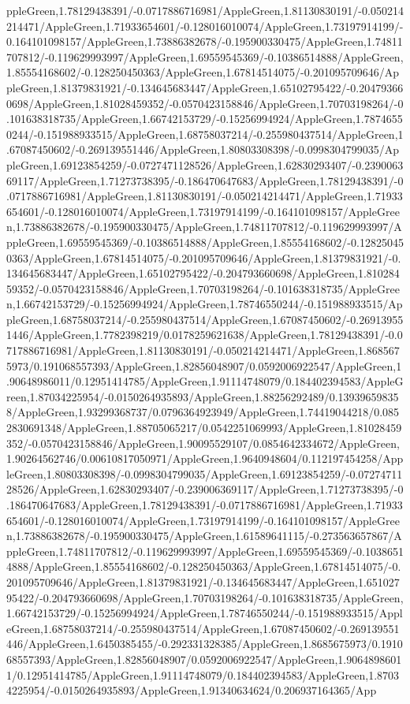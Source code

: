 {\begin{tikzternal}
{ppleGreen,1.78129438391/-0.0717886716981/AppleGreen,1.81130830191/-0.050214214471/AppleGreen,1.71933654601/-0.128016010074/AppleGreen,1.73197914199/-0.164101098157/AppleGreen,1.73886382678/-0.195900330475/AppleGreen,1.74811707812/-0.119629993997/AppleGreen,1.69559545369/-0.10386514888/AppleGreen,1.85554168602/-0.128250450363/AppleGreen,1.67814514075/-0.201095709646/AppleGreen,1.81379831921/-0.134645683447/AppleGreen,1.65102795422/-0.204793660698/AppleGreen,1.81028459352/-0.0570423158846/AppleGreen,1.70703198264/-0.101638318735/AppleGreen,1.66742153729/-0.15256994924/AppleGreen,1.78746550244/-0.151988933515/AppleGreen,1.68758037214/-0.255980437514/AppleGreen,1.67087450602/-0.269139551446/AppleGreen,1.80803308398/-0.0998304799035/AppleGreen,1.69123854259/-0.0727471128526/AppleGreen,1.62830293407/-0.239006369117/AppleGreen,1.71273738395/-0.186470647683/AppleGreen,1.78129438391/-0.0717886716981/AppleGreen,1.81130830191/-0.050214214471/AppleGreen,1.71933654601/-0.128016010074/AppleGreen,1.73197914199/-0.164101098157/AppleGreen,1.73886382678/-0.195900330475/AppleGreen,1.74811707812/-0.119629993997/AppleGreen,1.69559545369/-0.10386514888/AppleGreen,1.85554168602/-0.128250450363/AppleGreen,1.67814514075/-0.201095709646/AppleGreen,1.81379831921/-0.134645683447/AppleGreen,1.65102795422/-0.204793660698/AppleGreen,1.81028459352/-0.0570423158846/AppleGreen,1.70703198264/-0.101638318735/AppleGreen,1.66742153729/-0.15256994924/AppleGreen,1.78746550244/-0.151988933515/AppleGreen,1.68758037214/-0.255980437514/AppleGreen,1.67087450602/-0.269139551446/AppleGreen,1.7782398219/0.0178259621638/AppleGreen,1.78129438391/-0.0717886716981/AppleGreen,1.81130830191/-0.050214214471/AppleGreen,1.8685675973/0.191068557393/AppleGreen,1.82856048907/0.0592006922547/AppleGreen,1.90648986011/0.12951414785/AppleGreen,1.91114748079/0.184402394583/AppleGreen,1.87034225954/-0.0150264935893/AppleGreen,1.88256292489/0.139396598358/AppleGreen,1.93299368737/0.0796364923949/AppleGreen,1.74419044218/0.0852830691348/AppleGreen,1.88705065217/0.0542251069993/AppleGreen,1.81028459352/-0.0570423158846/AppleGreen,1.90095529107/0.0854642334672/AppleGreen,1.90264562746/0.00610817050971/AppleGreen,1.9640948604/0.112197454258/AppleGreen,1.80803308398/-0.0998304799035/AppleGreen,1.69123854259/-0.0727471128526/AppleGreen,1.62830293407/-0.239006369117/AppleGreen,1.71273738395/-0.186470647683/AppleGreen,1.78129438391/-0.0717886716981/AppleGreen,1.71933654601/-0.128016010074/AppleGreen,1.73197914199/-0.164101098157/AppleGreen,1.73886382678/-0.195900330475/AppleGreen,1.61589641115/-0.273563657867/AppleGreen,1.74811707812/-0.119629993997/AppleGreen,1.69559545369/-0.10386514888/AppleGreen,1.85554168602/-0.128250450363/AppleGreen,1.67814514075/-0.201095709646/AppleGreen,1.81379831921/-0.134645683447/AppleGreen,1.65102795422/-0.204793660698/AppleGreen,1.70703198264/-0.101638318735/AppleGreen,1.66742153729/-0.15256994924/AppleGreen,1.78746550244/-0.151988933515/AppleGreen,1.68758037214/-0.255980437514/AppleGreen,1.67087450602/-0.269139551446/AppleGreen,1.6450385455/-0.292331328385/AppleGreen,1.8685675973/0.191068557393/AppleGreen,1.82856048907/0.0592006922547/AppleGreen,1.90648986011/0.12951414785/AppleGreen,1.91114748079/0.184402394583/AppleGreen,1.87034225954/-0.0150264935893/AppleGreen,1.91340634624/0.206937164365/App}
\end{tikzternal}}
